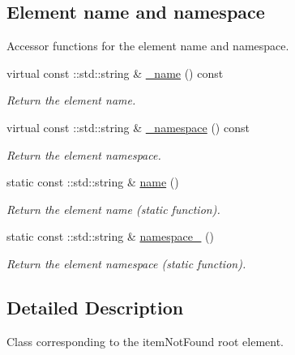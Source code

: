 \subsection*{Element name and namespace}
\label{_amgrpd4b5b61f6e07390f4af2465e04571f34}
Accessor functions for the element name and namespace. \begin{DoxyCompactItemize}
\item 
virtual const ::std::string \& \hyperlink{classopenstack_1_1xml_1_1ItemNotFound_a8075901806eb057b14591445c82e147e}{\_\-name} () const 
\begin{DoxyCompactList}\small\item\em Return the element name. \item\end{DoxyCompactList}\item 
virtual const ::std::string \& \hyperlink{classopenstack_1_1xml_1_1ItemNotFound_ab60308d32217219f39fb952f7eca092b}{\_\-namespace} () const 
\begin{DoxyCompactList}\small\item\em Return the element namespace. \item\end{DoxyCompactList}\item 
static const ::std::string \& \hyperlink{classopenstack_1_1xml_1_1ItemNotFound_a10077ff50d2b3434cdfb71c6248c6b83}{name} ()
\begin{DoxyCompactList}\small\item\em Return the element name (static function). \item\end{DoxyCompactList}\item 
static const ::std::string \& \hyperlink{classopenstack_1_1xml_1_1ItemNotFound_aae5be8d3d9b704af29c4891be4caf25a}{namespace\_\-} ()
\begin{DoxyCompactList}\small\item\em Return the element namespace (static function). \item\end{DoxyCompactList}\end{DoxyCompactItemize}


\subsection{Detailed Description}
Class corresponding to the itemNotFound root element. 


